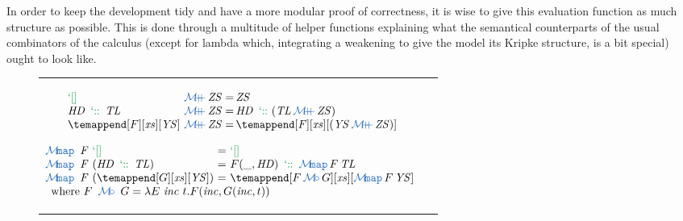 In order to keep the development tidy and have a more modular proof of correctness,
it is wise to give this evaluation function as much structure as possible. This is
done through a multitude of helper functions explaining what the semantical
counterparts of the usual combinators of the calculus (except for lambda which,
integrating a weakening to give the model its Kripke structure, is a bit special)
ought to look like.
\begin{figure*}
\small
\begin{tabular}{lr}
\begin{minipage}{0.45\textwidth}$$
\begin{array}{l@{~\vappend\mathit{ZS}=\,}l}
\tenil                          & \mathit{ZS} \\
\mathit{HD} \tecons \mathit{TL} & \mathit{HD} \tecons (\mathit{TL} \vappend \mathit{ZS}) \\
\temappend[F][\mathit{xs}][\mathit{YS}]
                                & \temappend[\mathit{F}][\mathit{xs}][(\mathit{YS} \vappend \mathit{ZS})]
\end{array}$$

$$\begin{array}{@{\vmap~\mathit{F}~}l@{~=~}l}
\tenil                          & \tenil \\
(\mathit{HD} \tecons \mathit{TL}) & F (\_, \mathit{HD}) \tecons \vmap F \, \mathit{TL} \\
(\temappend[G][\mathit{xs}][\mathit{YS}])
                                & \temappend[F \vcomp G][\mathit{xs}][\vmap F \, \mathit{YS}] \\
\multicolumn{2}{l}{\text{where}~ F ~\vcomp~ G = \lambda E~\mathit{inc}~t. F (\mathit{inc}, G(\mathit{inc},t))}
\end{array}$$


\end{minipage}
\end{tabular}
\end{figure*}
